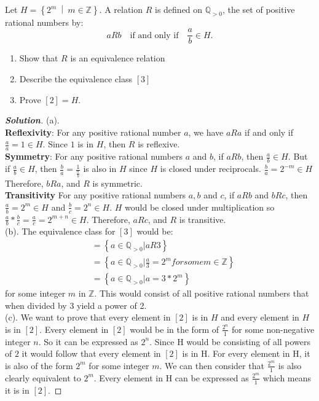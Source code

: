 \documentclass[11pt]{article}
\newenvironment{problem}[2][Problem\!]{\begin{trivlist}
\item[\hskip \labelsep {\bfseries #1}\hskip \labelsep {\bfseries #2.}]}{\end{trivlist}}
\newenvironment{solution}{\begin{proof}[\textbf{\textit{Solution}}]}{\end{proof}}
\newcommand{\zz}{\mathbb Z}   %
\newcommand{\qq}{\mathbb Q}   %
\newcommand{\set}[1]{\left\{#1\right\}} %
\newcommand{\setp}[2]{\left\{#1\ \middle|\ #2\right\}} %
\begin{document}
\begin{problem}{7.4}
Let $H = \setp{2^m}{m \in \zz}$. A relation $R$ is defined on $\qq_{>0}$, the set of positive rational numbers by: \[a R b \quad \text{if and only if} \quad \frac{a}{b} \in H.\]
\begin{enumerate}
    \item [(a)] Show that $R$ is an equivalence relation
    \item [(b)] Describe the equivalence class $[3]$
    \item [(c)] Prove $[2] = H$.
\end{enumerate}

\begin{solution}
(a).\\
\textbf{Reflexivity}: For any positive rational number \(a\), we have \(aRa\) if and only if \(\frac{a}{a} = 1 \in H\). Since \(1\) is in \(H\), then \(R\) is reflexive.\\
\textbf{Symmetry}: For any positive rational numbers \(a\) and \(b\), if \(aRb\), then \(\frac{a}{b} \in H\). But if \(\frac{a}{b} \in H\), then \(\frac{b}{a} = \frac{1}{\frac{a}{b}}\) is also in \(H\) since \(H\) is closed under reciprocals. \(\frac{b}{a} = 2^{-m} \in H\) Therefore, \(bRa\), and \(R\) is symmetric.\\
\textbf{Transitivity} For any positive rational numbers \(a,b\) and \(c\), if \(aRb\) and \(bRc\), then \(\frac{a}{b} = 2^m \in H\) and \(\frac{b}{c} = 2^n \in H\). \(H\) would be closed under multiplication so \(\frac{a}{b} * \frac{b}{c} = \frac{a}{c} = 2^{m+n}\in H\). Therefore, \(aRc\), and \(R\) is transitive.\\
(b). The equivalence class for \([3]\) would be:
\begin{align*}
[3] &= \set{a \in \qq_{>0} | aR3}\\
&= \set{a \in \qq_{>0} | \frac{a}{3} = 2^m for some m \in \zz}\\
&= \set{a \in \qq_{>0} | a = 3 * 2^m}
\end{align*}
for some integer \(m\) in \(\zz\). This would consist of all positive rational numbers that when divided by 3 yield a power of 2.\\
(c). We want to prove that every element in \([2]\) is in \(H\) and every element in \(H\) is in \([2]\). Every element in \([2]\) would be in the form of \(\frac{2^n}{1}\) for some non-negative integer \(n\). So it can be expressed as \(2^n\). Since H would be consisting of all powers of \(2\) it would follow that every element in \([2]\) is in H. For every element in H, it is also of the form \(2^m\) for some integer \(m\). We can then consider that \(\frac{2^m}{1}\) is also clearly equivalent to \(2^m\). Every element in H can be expressed as \(\frac{2^m}{1}\) which means it is in \([2]\).
\end{solution}

\end{problem}
\end{document}
